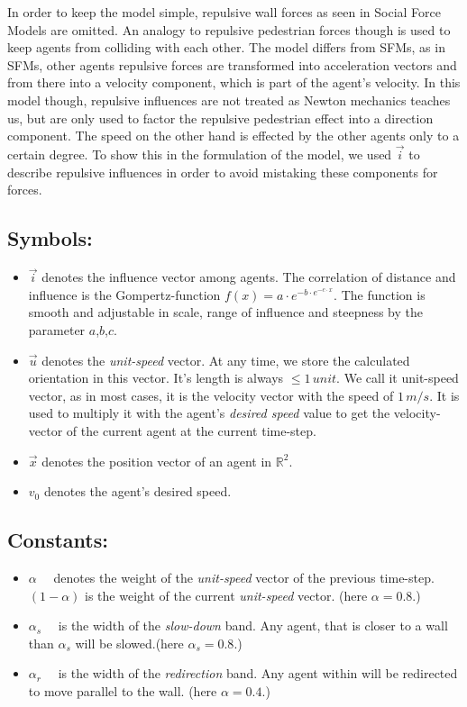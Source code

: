 In order to keep the model simple, repulsive wall forces as seen in Social Force Models are omitted. An analogy to repulsive pedestrian forces though is used to keep agents from colliding with each other. The model differs from SFMs, as in SFMs, other agents repulsive forces are transformed into acceleration vectors and from there into a velocity component, which is part of the agent's velocity. In this model though, repulsive influences are not treated as Newton mechanics teaches us, but are only used to factor the repulsive pedestrian effect into a direction component. The speed on the other hand is effected by the other agents only to a certain degree. To show this in the formulation of the model, we used $\vec{i}$ to describe repulsive influences in order to avoid mistaking these components for forces.
%
\subsection*{Symbols:}
\begin{itemize}
\item $\vec{i}$ denotes the influence vector among agents. The correlation of distance and influence is the Gompertz-function $f(x)=a \cdot e^{-b\cdot e^{-c \cdot x}}$. The function is smooth and adjustable in scale, range of influence and steepness by the parameter $a$,$b$,$c$.
\item $\vec{u}$ denotes the \emph{unit-speed} vector. At any time, we store the calculated orientation in this vector. It's length is always $\leq 1\,unit$. We call it unit-speed vector, as in most cases, it is the velocity vector with the speed of $1\,m/s$. It is used to multiply it with the agent's \emph{desired speed} value to get the velocity-vector of the current agent at the current time-step.
\item $\vec{x}$ denotes the position vector of an agent in $\mathbb{R}^2$.
\item $v_0$ denotes the agent's desired speed.
\end{itemize}
%
\subsection*{Constants:}
\begin{itemize}
\item $\alpha \quad$ denotes the weight of the \emph{unit-speed} vector of the previous time-step. $(1-\alpha)$ is the weight of the current \emph{unit-speed} vector. (here $\alpha = 0.8$.)
\item $\alpha_s \quad$ is the width of the \emph{slow-down} band. Any agent, that is closer to a wall than $\alpha_s$ will be slowed.(here $\alpha_s = 0.8$.)
\item $\alpha_r \quad$ is the width of the \emph{redirection} band. Any agent within will be redirected to move parallel to the wall. (here $\alpha = 0.4$.)
\end{itemize}
%
